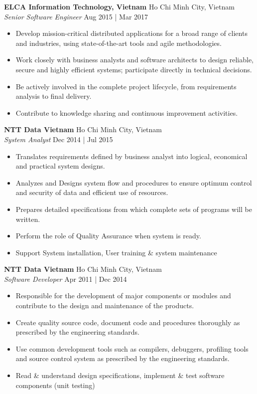 \documentclass[a4paper]{article}
\begin{document}
\textbf{ELCA Information Technology, Vietnam} \hfill Ho Chi Minh City, Vietnam\\
\textit{Senior Software Engineer} \hfill Aug 2015 | Mar 2017\\
\vspace{-1mm}
\begin{itemize} \itemsep 1pt
	\item Develop mission-critical distributed applications for a broad range of clients and industries, using state-of-the-art tools and agile methodologies.
	\item Work closely with business analysts and software architects to design reliable, secure and highly efficient systems; participate directly in technical decisions.
	\item Be actively involved in the complete project lifecycle, from requirements analysis to final delivery.
	\item Contribute to knowledge sharing and continuous improvement activities.
\end{itemize}
\textbf{NTT Data Vietnam} \hfill Ho Chi Minh City, Vietnam\\
\textit{System Analyst} \hfill Dec 2014 | Jul 2015\\
\vspace{-1mm}
\begin{itemize} \itemsep 1pt
	\item Translates requirements defined by business analyst into logical, economical and practical system designs.
	\item Analyzes and Designs system flow and procedures to ensure optimum control and security of data and efficient use of resources.
	\item Prepares detailed specifications from which complete sets of programs will be written.
	\item Perform the role of Quality Assurance when system is ready.
	\item Support System installation, User training \& system maintenance
\end{itemize}

\newpage

\textbf{NTT Data Vietnam} \hfill Ho Chi Minh City, Vietnam\\
\textit{Software Developer} \hfill Apr 2011 | Dec 2014\\
\vspace{-1mm}
\begin{itemize} \itemsep 1pt
	\item Responsible for the development of major components or modules and contribute to the design and maintenance of the products.
	\item Create quality source code, document code and procedures thoroughly as prescribed by the engineering standards.
	\item Use common development tools such as compilers, debuggers, profiling tools and source control system as prescribed by the engineering standards.
	\item Read \& understand design specifications, implement \& test software components (unit testing)
\end{itemize}
\end{document}
